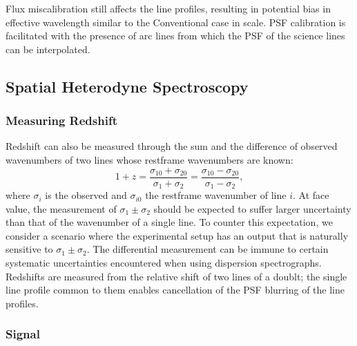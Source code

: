 \documentclass[preprint2, 10pt]{aastex}
\begin{document}
Flux miscalibration still affects the line profiles, resulting in potential bias in effective 
wavelength similar to
the Conventional case in scale.  PSF calibration is facilitated with the presence of arc lines from which the
PSF  of the science lines can be interpolated.


\subsection{Spatial Heterodyne Spectroscopy}
\label{SHS:sec} 

\subsubsection{Measuring Redshift}
Redshift can also be measured through the sum and the difference of observed wavenumbers of two lines whose restframe wavenumbers are known:
\begin{equation}
1+z=\frac{\sigma_{10}+\sigma_{20}}{\sigma_{1}+\sigma_{2}}=\frac{\sigma_{10}-\sigma_{20}}{\sigma_{1}-\sigma_{2}},
\label{redshift:eqn}
\end{equation}
where $\sigma_i$ is the observed and $\sigma_{i0}$ the restframe wavenumber of line $i$.
At face value, the measurement of $\sigma_1\pm\sigma_2$ should be expected to suffer larger uncertainty than that of the wavenumber
of a single line.  To counter this expectation, we consider a scenario where the experimental setup has an output that is naturally sensitive
to $\sigma_1\pm\sigma_2$.  The differential measurement can be immune to certain systematic uncertainties encountered when using dispersion spectrographs.
Redshifts are measured from the relative shift of two lines of a doublt; 
the single line profile common to them enables cancellation of the PSF blurring of the
line profiles.


\subsubsection{Signal}
\end{document}
